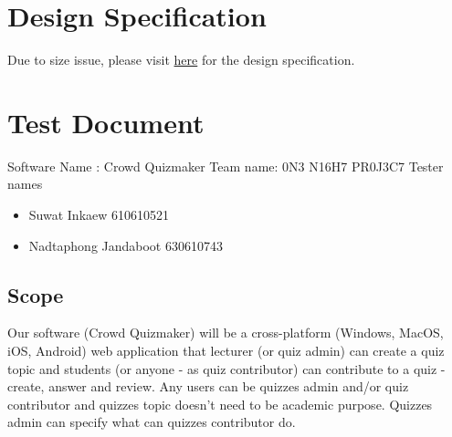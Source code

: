\documentclass[ 10pt]{report}
\begin{document}

    \chapter{Design Specification}
    Due to size issue, please visit \href{https://github.com/IkaWaAyuMu/261361-Project/blob/main/documents/A3/A3 1.0.pdf}{here} for the design specification.

    \chapter{Test Document}

    Software Name : Crowd Quizmaker
    Team name: 0N3 N16H7 PR0J3C7
    Tester names
    \begin{itemize}
        \item Suwat Inkaew 610610521
        \item Nadtaphong Jandaboot 630610743
    \end{itemize}
    \section{Scope}
        Our software (Crowd Quizmaker) will be a cross-platform (Windows, MacOS, iOS, Android) web application that lecturer (or quiz admin) can create a quiz topic and students (or anyone - as quiz contributor) can contribute to a quiz - create, answer and review. Any users can be quizzes admin and/or quiz contributor and quizzes topic doesn’t need to be academic purpose. Quizzes admin can specify what can quizzes contributor do.
\end{document}
